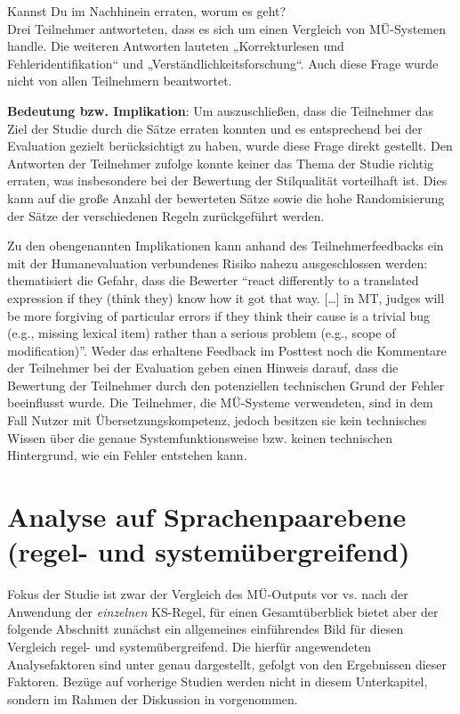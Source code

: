 \begin{description}[font = \normalfont]
\item[6.] Kannst Du im Nachhinein erraten, worum es geht?\\
Drei Teilnehmer antworteten, dass es sich um einen Vergleich von MÜ-Systemen handle. Die weiteren Antworten lauteten „Korrekturlesen und Fehleridentifikation“ und „Verständlichkeitsforschung“. Auch diese Frage wurde nicht von allen Teilnehmern beantwortet.

\textbf{Bedeutung bzw. Implikation}: Um auszuschließen, dass die Teilnehmer das Ziel der Studie durch die Sätze erraten konnten und es entsprechend bei der Evaluation gezielt berücksichtigt zu haben, wurde diese Frage direkt gestellt. Den Antworten der Teilnehmer zufolge konnte keiner das Thema der Studie richtig erraten, was insbesondere bei der Bewertung der Stilqualität vorteilhaft ist. Dies kann auf die große Anzahl der bewerteten Sätze sowie die hohe Randomisierung der Sätze der verschiedenen Regeln zurückgeführt werden.
\end{description}


Zu den obengenannten Implikationen kann anhand des Teilnehmerfeedbacks ein mit der Humanevaluation verbundenes Risiko nahezu ausgeschlossen werden: \citet{White2003} thematisiert die Gefahr, dass die Bewerter “react differently to a translated expression if they (think they) know how it got that way. [\ldots] in MT, judges will be more forgiving of particular errors if they think their cause is a trivial bug (e.g., missing lexical item) rather than a serious problem (e.g., scope of modification)”. Weder das erhaltene Feedback im Posttest noch die Kommentare der Teilnehmer bei der Evaluation geben einen Hinweis darauf, dass die Bewertung der Teilnehmer durch den potenziellen technischen Grund der Fehler beeinflusst wurde. Die Teilnehmer, die MÜ-Systeme verwendeten, sind in dem Fall Nutzer mit Übersetzungskompetenz, jedoch besitzen sie kein technisches Wissen über die genaue Systemfunktionsweise bzw. keinen technischen Hintergrund, wie ein Fehler entstehen kann.

\section{\label{sec:5.2} Analyse auf Sprachenpaarebene (regel- und systemübergreifend)}

Fokus der Studie ist zwar der Vergleich des MÜ-Outputs vor vs. nach der Anwendung der \textit{einzelnen} KS-Regel, für einen Gesamtüberblick bietet aber der folgende Abschnitt zunächst ein allgemeines einführendes Bild für diesen Vergleich regel- und systemübergreifend. Die hierfür angewendeten Analysefaktoren sind unter  genau dargestellt, gefolgt von den Ergebnissen dieser Faktoren. Bezüge auf vorherige Studien werden nicht in diesem Unterkapitel, sondern im Rahmen der Diskussion in  vorgenommen.


